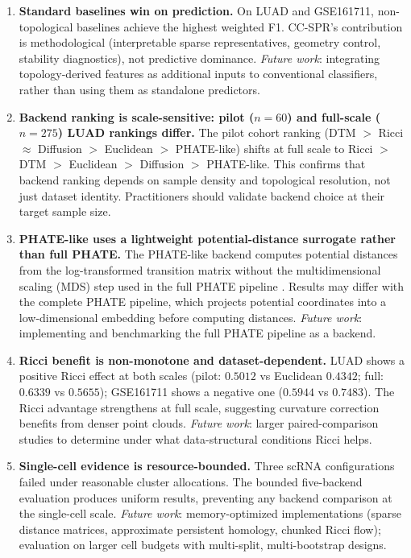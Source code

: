 \documentclass[11pt]{article}
\begin{document}
\begin{enumerate}[leftmargin=1.5em]
\item \textbf{Standard baselines win on prediction.}
On LUAD and GSE161711, non-topological baselines achieve the highest weighted F1.
CC-SPR's contribution is methodological (interpretable sparse representatives, geometry control, stability diagnostics), not predictive dominance.
\emph{Future work}: integrating topology-derived features as additional inputs to conventional classifiers, rather than using them as standalone predictors.

\item \textbf{Backend ranking is scale-sensitive: pilot ($n = 60$) and full-scale ($n = 275$) LUAD rankings differ.}
The pilot cohort ranking (DTM $>$ Ricci $\approx$ Diffusion $>$ Euclidean $>$ PHATE-like) shifts at full scale to Ricci $>$ DTM $>$ Euclidean $>$ Diffusion $>$ PHATE-like.
This confirms that backend ranking depends on sample density and topological resolution, not just dataset identity.
Practitioners should validate backend choice at their target sample size.

\item \textbf{PHATE-like uses a lightweight potential-distance surrogate rather than full PHATE.}
The PHATE-like backend computes potential distances from the log-transformed transition matrix without the multidimensional scaling (MDS) step used in the full PHATE pipeline \cite{moon2019phate}.
Results may differ with the complete PHATE pipeline, which projects potential coordinates into a low-dimensional embedding before computing distances.
\emph{Future work}: implementing and benchmarking the full PHATE pipeline as a backend.

\item \textbf{Ricci benefit is non-monotone and dataset-dependent.}
LUAD shows a positive Ricci effect at both scales (pilot: $0.5012$ vs Euclidean $0.4342$; full: $0.6339$ vs $0.5655$); GSE161711 shows a negative one ($0.5944$ vs $0.7483$).
The Ricci advantage strengthens at full scale, suggesting curvature correction benefits from denser point clouds.
\emph{Future work}: larger paired-comparison studies to determine under what data-structural conditions Ricci helps.

\item \textbf{Single-cell evidence is resource-bounded.}
Three scRNA configurations failed under reasonable cluster allocations.
The bounded five-backend evaluation produces uniform results, preventing any backend comparison at the single-cell scale.
\emph{Future work}: memory-optimized implementations (sparse distance matrices, approximate persistent homology, chunked Ricci flow); evaluation on larger cell budgets with multi-split, multi-bootstrap designs.


\end{enumerate}
\end{document}
